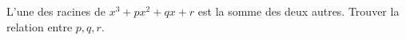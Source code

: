 L'une des racines de $x^3 + px^2 + qx + r$ est la somme des deux autres. Trouver la relation entre $p, q, r$.
